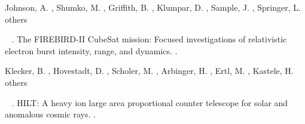 \documentclass[draft]{agujournal2019}
\begin{document}
\begin{thebibliography}{}
    \begin{APACrefauthors}%
    Johnson, A.%
    , Shumko, M.%
    , Griffith, B.%
    , Klumpar, D.%
    , Sample, J.%
    , Springer, L.%
    \BDBL {}others%
    \end{APACrefauthors}%
    \unskip\
    \newblock
    .
    \newblock
    {\BBOQ}
      {The {FIREBIRD-II} {CubeSat} mission: Focused investigations of relativistic
      electron burst intensity, range, and dynamics}.{\BBCQ}
    \newblock
    .
    \PrintBackRefs{\CurrentBib}
    
    \begin{APACrefauthors}%
    Klecker, B.%
    , Hovestadt, D.%
    , Scholer, M.%
    , Arbinger, H.%
    , Ertl, M.%
    , Kastele, H.%
    \BDBL {}others%
    \end{APACrefauthors}%
    \unskip\
    \newblock
    .
    \newblock
    {\BBOQ} {{HILT}: A heavy ion large
      area proportional counter telescope for solar and anomalous cosmic
      rays}.{\BBCQ}
    \newblock
    .
    \PrintBackRefs{\CurrentBib}
    

\end{thebibliography}
\end{document}
